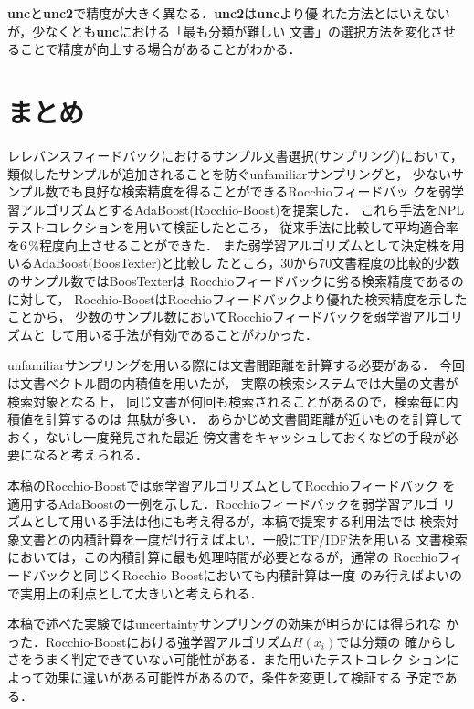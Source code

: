 {\bf unc}と{\bf unc2}で精度が大きく異なる．{\bf unc2}は{\bf unc}より優
れた方法とはいえないが，少なくとも{\bf unc}における「最も分類が難しい
文書」の選択方法を変化させることで精度が向上する場合があることがわかる．

\section{まとめ}
レレバンスフィードバックにおけるサンプル文書選択(サンプリング)において，
類似したサンプルが追加されることを防ぐunfamiliarサンプリングと，
少ないサンプル数でも良好な検索精度を得ることができるRocchioフィードバッ
クを弱学習アルゴリズムとするAdaBoost(Rocchio-Boost)を提案した．
これら手法をNPLテストコレクションを用いて検証したところ，
従来手法に比較して平均適合率を6\,\%程度向上させることができた．
また弱学習アルゴリズムとして決定株を用いるAdaBoost(BoosTexter)と比較し
たところ，30から70文書程度の比較的少数のサンプル数ではBoosTexterは
Rocchioフィードバックに劣る検索精度であるのに対して，
Rocchio-BoostはRocchioフィードバックより優れた検索精度を示したことから，
少数のサンプル数においてRocchioフィードバックを弱学習アルゴリズムと
して用いる手法が有効であることがわかった．

unfamiliarサンプリングを用いる際には文書間距離を計算する必要がある．
今回は文書ベクトル間の内積値を用いたが，
実際の検索システムでは大量の文書が検索対象となる上，
同じ文書が何回も検索されることがあるので，検索毎に内積値を計算するのは
無駄が多い．
あらかじめ文書間距離が近いものを計算しておく，ないし一度発見された最近
傍文書をキャッシュしておくなどの手段が必要になると考えられる．

本稿のRocchio-Boostでは弱学習アルゴリズムとしてRocchioフィードバック
を適用するAdaBoostの一例を示した．Rocchioフィードバックを弱学習アルゴ
リズムとして用いる手法は他にも考え得るが，本稿で提案する利用法では
検索対象文書との内積計算を一度だけ行えばよい．一般にTF/IDF法を用いる
文書検索においては，この内積計算に最も処理時間が必要となるが，通常の
Rocchioフィードバックと同じくRocchio-Boostにおいても内積計算は一度
のみ行えばよいので実用上の利点として大きいと考えられる．

本稿で述べた実験ではuncertaintyサンプリングの効果が明らかには得られな
かった．Rocchio-Boostにおける強学習アルゴリズム$H(x_{i})$では分類の
確からしさをうまく判定できていない可能性がある．また用いたテストコレク
ションによって効果に違いがある可能性があるので，条件を変更して検証する
予定である．






\begin{biography}



\end{biography}

